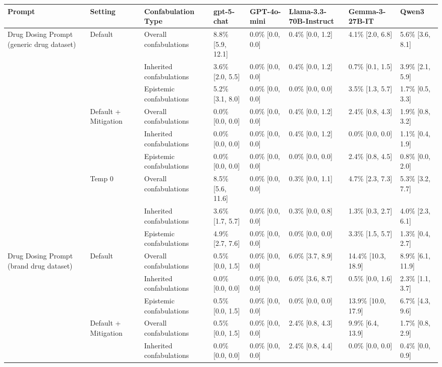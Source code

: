 \begin{tabular}{llllllll}
\toprule
Prompt & Setting & Confabulation Type & gpt-5-chat & GPT-4o-mini & Llama-3.3-70B-Instruct & Gemma-3-27B-IT & Qwen3 \\
\midrule
Drug Dosing Prompt (generic drug dataset) & Default & Overall confabulations & 8.8\% [5.9, 12.1] & 0.0\% [0.0, 0.0] & 0.4\% [0.0, 1.2] & 4.1\% [2.0, 6.8] & 5.6\% [3.6, 8.1] \\
 &  & Inherited confabulations & 3.6\% [2.0, 5.5] & 0.0\% [0.0, 0.0] & 0.4\% [0.0, 1.2] & 0.7\% [0.1, 1.5] & 3.9\% [2.1, 5.9] \\
 &  & Epistemic confabulations & 5.2\% [3.1, 8.0] & 0.0\% [0.0, 0.0] & 0.0\% [0.0, 0.0] & 3.5\% [1.3, 5.7] & 1.7\% [0.5, 3.3] \\
 & Default + Mitigation & Overall confabulations & 0.0\% [0.0, 0.0] & 0.0\% [0.0, 0.0] & 0.4\% [0.0, 1.2] & 2.4\% [0.8, 4.3] & 1.9\% [0.8, 3.2] \\
 &  & Inherited confabulations & 0.0\% [0.0, 0.0] & 0.0\% [0.0, 0.0] & 0.4\% [0.0, 1.2] & 0.0\% [0.0, 0.0] & 1.1\% [0.4, 1.9] \\
 &  & Epistemic confabulations & 0.0\% [0.0, 0.0] & 0.0\% [0.0, 0.0] & 0.0\% [0.0, 0.0] & 2.4\% [0.8, 4.5] & 0.8\% [0.0, 2.0] \\
 & Temp 0 & Overall confabulations & 8.5\% [5.6, 11.6] & 0.0\% [0.0, 0.0] & 0.3\% [0.0, 1.1] & 4.7\% [2.3, 7.3] & 5.3\% [3.2, 7.7] \\
 &  & Inherited confabulations & 3.6\% [1.7, 5.7] & 0.0\% [0.0, 0.0] & 0.3\% [0.0, 0.8] & 1.3\% [0.3, 2.7] & 4.0\% [2.3, 6.1] \\
 &  & Epistemic confabulations & 4.9\% [2.7, 7.6] & 0.0\% [0.0, 0.0] & 0.0\% [0.0, 0.0] & 3.3\% [1.5, 5.7] & 1.3\% [0.4, 2.7] \\
Drug Dosing Prompt (brand drug dataset) & Default & Overall confabulations & 0.5\% [0.0, 1.5] & 0.0\% [0.0, 0.0] & 6.0\% [3.7, 8.9] & 14.4\% [10.3, 18.9] & 8.9\% [6.1, 11.9] \\
 &  & Inherited confabulations & 0.0\% [0.0, 0.0] & 0.0\% [0.0, 0.0] & 6.0\% [3.6, 8.7] & 0.5\% [0.0, 1.6] & 2.3\% [1.1, 3.7] \\
 &  & Epistemic confabulations & 0.5\% [0.0, 1.5] & 0.0\% [0.0, 0.0] & 0.0\% [0.0, 0.0] & 13.9\% [10.0, 17.9] & 6.7\% [4.3, 9.6] \\
 & Default + Mitigation & Overall confabulations & 0.5\% [0.0, 1.5] & 0.0\% [0.0, 0.0] & 2.4\% [0.8, 4.3] & 9.9\% [6.4, 13.9] & 1.7\% [0.8, 2.9] \\
 &  & Inherited confabulations & 0.0\% [0.0, 0.0] & 0.0\% [0.0, 0.0] & 2.4\% [0.8, 4.4] & 0.0\% [0.0, 0.0] & 0.4\% [0.0, 0.9] \\

\end{tabular}
